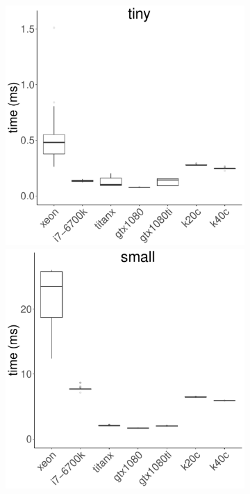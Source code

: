 \documentclass[../document.tex]{subfiles}
\begin{document}
\begin{figure}
	\begin{subfigure}{0.09\textwidth} \label{fig:time-gem} \vspace{5mm}\end{subfigure}
	\begin{subfigure}{0.9\textwidth}
		\includegraphics[width=\plotwidth]{figures/time-results/generate_gem_tiny_boxplot-1}
		\includegraphics[width=\plotwidth]{figures/time-results/generate_gem_small_boxplot-1}

\end{subfigure}
\end{figure}
\end{document}
